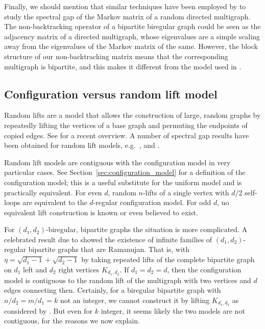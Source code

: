 Finally, we should mention that similar techniques have been employed by \citet*{coste2017} 
to study the spectral gap of the Markov matrix of a random directed multigraph. 
The non-backtracking operator of a bipartite biregular graph 
could be seen as the adjacency matrix of a directed multigraph, 
whose eigenvalues are a simple scaling away from the eigenvalues of the Markov matrix of the same. 
However, the block structure of our non-backtracking matrix means that 
the corresponding multigraph is bipartite, 
and this makes it different from the model used in \citet*{coste2017}. 

\subsection{Configuration versus random lift model}\label{sec:1.2}

Random lifts are a model that allows the construction of large,
random graphs by repeatedly lifting the vertices of a base graph
and permuting the endpoints of copied edges.
See
\citet*{bordenave2015} for a recent overview.
A number of spectral gap results have been obtained for random lift models,
e.g.\ \citet*{friedman2003a,angel2007,friedman2014}, and \citet*{bordenave2015}.

Random lift models are contiguous with the configuration model 
in very particular cases.
See Section~\ref{sec:configuration_model} for a definition of 
the configuration model; 
this is a useful substitute for the uniform model and is practically 
equivalent.
For even $d$, 
random $n$-lifts of a single vertex with $d/2$ self-loops
are equivalent to the $d$-regular 
configuration model.
For odd $d$, no equivalent lift construction is known
or even believed to exist.

For $(d_1, d_2)$-biregular, bipartite
graphs the situation is more complicated.
A celebrated result due to \citet*{marcus2013} 
showed the existence of infinite
families of $(d_1, d_2)$-regular bipartite graphs that are Ramanujan.
That is, with 
$\eta = \sqrt{d_1-1} + \sqrt{d_2 - 1}$
by taking repeated lifts of the complete bipartite graph on $d_1$ left and $d_2$ right vertices $K_{d_1,d_2}$.
If $d_1=d_2=d$, then the configuration model is contiguous to 
the random lift of the multigraph with two vertices and
$d$ edges connecting then.
Certainly, for a biregular bipartite graph with
$n/d_2=m/d_1=k$ not an integer,
we cannot construct it by lifting $K_{d_1, d_2}$
as considered by \citet*{marcus2013}.
But even for $k$ integer, it seems likely the 
two models are not contiguous,
for the reasons we now explain.

